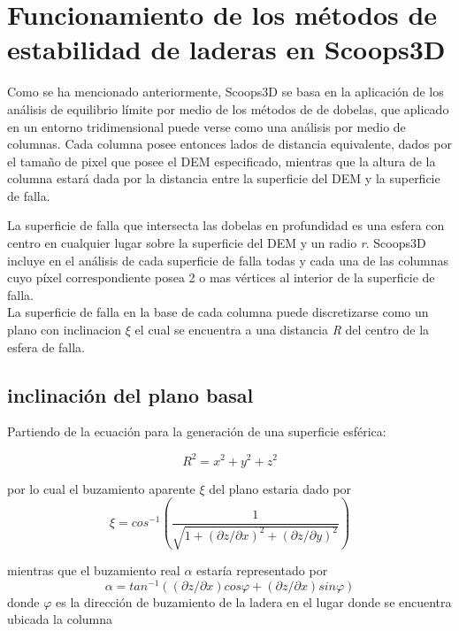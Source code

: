 \section{Funcionamiento de los m\'etodos de estabilidad de laderas en Scoops3D}



Como se ha mencionado anteriormente, Scoops3D se basa en la aplicaci\'on de los an\'alisis de equilibrio l\'imite por medio de los m\'etodos de de dobelas, que aplicado en un entorno tridimensional puede verse como una an\'alisis por medio de columnas.
Cada columna posee entonces lados de distancia equivalente, dados por el tama\~no de pixel que posee el DEM especificado, mientras que la altura de la columna estar\'a dada por la distancia entre la superficie del DEM y la superficie de falla.

La superficie de falla que intersecta las dobelas en profundidad es una esfera con centro en cualquier lugar sobre la superficie del DEM y un radio \textit{r}. Scoops3D incluye en el an\'alisis de cada superficie de falla todas y cada una de las columnas cuyo p\'ixel correspondiente posea 2 o mas v\'ertices al interior de la superficie de falla.\\

La superficie de falla en la base de cada columna puede discretizarse como un plano con inclinacion $ \xi$ el cual se encuentra a una distancia \textit{R} del centro de la esfera de falla.


\subsection{inclinaci\'on del plano basal}


Partiendo de la ecuaci\'on para la generaci\'on de una superficie esf\'erica:

$$ \textit{R}^{2} = \textit{x}^{2} + \textit{y}^{2} + \textit{z}^{2}$$

por lo cual el buzamiento aparente $\xi$ del plano estaria dado por
$$ \xi = \textit{cos}^{-1}  (\dfrac{1}{\sqrt{1+(\partial z/ \partial x)^{2} + (\partial z/ \partial y)^{2} }})   $$ 

mientras que el buzamiento real $ \alpha$ estar\'ia representado por \\
$$ \alpha = tan^{-1} ((\partial z/ \partial x)\textit{cos}\varphi +(\partial z/ \partial x)\textit{sin}\varphi )  $$
donde $\varphi$ es la direcci\'on de buzamiento de la ladera en el lugar donde se encuentra ubicada la columna

